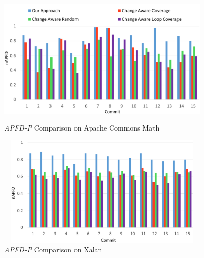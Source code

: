 \begin{figure}
		\centering
		\includegraphics[width=4in, height=2.5in]{performance/images/common-math-apfd.pdf}
		
		\caption{\textit{APFD-P} Comparison on Apache Commons Math}	
		\label{fig:common-math-apfd}


\end{figure}

\begin{figure}
		\centering
		\includegraphics[width=4in, height=2.1in]{performance/images/xalan-apfd.pdf}
			
		\caption{\textit{APFD-P} Comparison on Xalan}
	
		\label{fig:xalan-apfd}
\end{figure}

%

